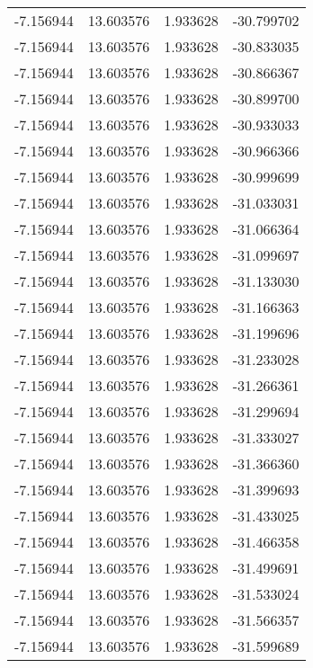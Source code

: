 \begin{tabular}{rrrr}
       -7.156944 &        13.603576 &    1.933628 & -30.799702 \\
       -7.156944 &        13.603576 &    1.933628 & -30.833035 \\
       -7.156944 &        13.603576 &    1.933628 & -30.866367 \\
       -7.156944 &        13.603576 &    1.933628 & -30.899700 \\
       -7.156944 &        13.603576 &    1.933628 & -30.933033 \\
       -7.156944 &        13.603576 &    1.933628 & -30.966366 \\
       -7.156944 &        13.603576 &    1.933628 & -30.999699 \\
       -7.156944 &        13.603576 &    1.933628 & -31.033031 \\
       -7.156944 &        13.603576 &    1.933628 & -31.066364 \\
       -7.156944 &        13.603576 &    1.933628 & -31.099697 \\
       -7.156944 &        13.603576 &    1.933628 & -31.133030 \\
       -7.156944 &        13.603576 &    1.933628 & -31.166363 \\
       -7.156944 &        13.603576 &    1.933628 & -31.199696 \\
       -7.156944 &        13.603576 &    1.933628 & -31.233028 \\
       -7.156944 &        13.603576 &    1.933628 & -31.266361 \\
       -7.156944 &        13.603576 &    1.933628 & -31.299694 \\
       -7.156944 &        13.603576 &    1.933628 & -31.333027 \\
       -7.156944 &        13.603576 &    1.933628 & -31.366360 \\
       -7.156944 &        13.603576 &    1.933628 & -31.399693 \\
       -7.156944 &        13.603576 &    1.933628 & -31.433025 \\
       -7.156944 &        13.603576 &    1.933628 & -31.466358 \\
       -7.156944 &        13.603576 &    1.933628 & -31.499691 \\
       -7.156944 &        13.603576 &    1.933628 & -31.533024 \\
       -7.156944 &        13.603576 &    1.933628 & -31.566357 \\
       -7.156944 &        13.603576 &    1.933628 & -31.599689 \\

\end{tabular}
